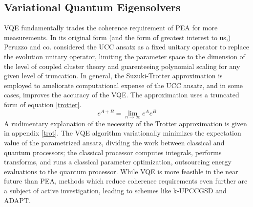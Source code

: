 \documentclass{article}
\begin{document}
\subsection{Variational Quantum Eigensolvers}
\begin{paragraph}{}
VQE fundamentally trades the coherence requirement of PEA for more measurements. \cite{peruzzo} In its original form (and the form of greatest interest to us,) Peruzzo and co. considered the UCC ansatz as a fixed unitary operator to replace the evolution unitary operator, limiting the parameter space to the dimension of the level of coupled cluster theory and guarenteeing polynomial scaling for any given level of truncation. \cite{peruzzo} In general, the Suzuki-Trotter approximation is employed to ameliorate computational expense of the UCC ansatz, and in some cases, improves the accuracy of the VQE. \cite{grimsley, joonho, suzuki} The approximation uses a truncated form of equation \ref{trotter}. \cite{suzuki}
\begin{equation}\label{trotter}
e^{A+B}=\lim_{n\to\infty}e^{A}e^{B}
\end{equation}
A rudimentary explanation of the necessity of the Trotter approximation is given in appendix \ref{trot}. The VQE algorithm variationally minimizes the expectation value of the parametrized ansatz, dividing the work between classical and quantum processors; the classical processor computes integrals, performs transforms, and runs a classical parameter optimization, outsourcing energy evaluations to the quantum processor. \cite{peruzzo}  While VQE is more feasible in the near future than PEA, methods which reduce coherence requirements even further are a subject of active investigation, leading to schemes like k-UPCCGSD and ADAPT. \cite{peruzzo,grimsley,joonho}
\end{paragraph}
\end{document}
